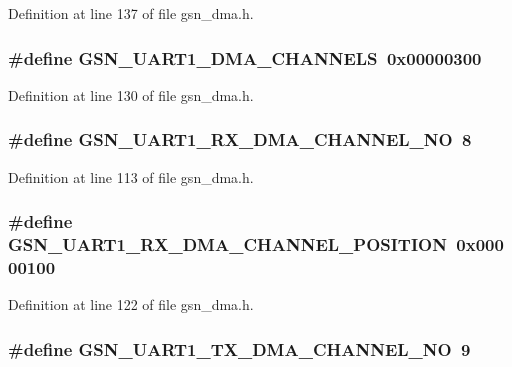 Definition at line 137 of file gsn\_\-dma.h.

\hypertarget{a00484_a49bae6c89e0e2813bc051b25e1961d6e}{
\subsubsection[{GSN\_\-UART1\_\-DMA\_\-CHANNELS}]{\setlength{\rightskip}{0pt plus 5cm}\#define GSN\_\-UART1\_\-DMA\_\-CHANNELS~0x00000300}}
\label{a00484_a49bae6c89e0e2813bc051b25e1961d6e}


Definition at line 130 of file gsn\_\-dma.h.

\hypertarget{a00484_a764876fc0a3f5d8b04993ca6b5ddbf62}{
\subsubsection[{GSN\_\-UART1\_\-RX\_\-DMA\_\-CHANNEL\_\-NO}]{\setlength{\rightskip}{0pt plus 5cm}\#define GSN\_\-UART1\_\-RX\_\-DMA\_\-CHANNEL\_\-NO~8}}
\label{a00484_a764876fc0a3f5d8b04993ca6b5ddbf62}


Definition at line 113 of file gsn\_\-dma.h.

\hypertarget{a00484_a8b6623ecbbaf5c3c6caa554e28b12def}{
\subsubsection[{GSN\_\-UART1\_\-RX\_\-DMA\_\-CHANNEL\_\-POSITION}]{\setlength{\rightskip}{0pt plus 5cm}\#define GSN\_\-UART1\_\-RX\_\-DMA\_\-CHANNEL\_\-POSITION~0x00000100}}
\label{a00484_a8b6623ecbbaf5c3c6caa554e28b12def}


Definition at line 122 of file gsn\_\-dma.h.

\hypertarget{a00484_a74b550c1871cad275c9f099bf48e3a34}{
\subsubsection[{GSN\_\-UART1\_\-TX\_\-DMA\_\-CHANNEL\_\-NO}]{\setlength{\rightskip}{0pt plus 5cm}\#define GSN\_\-UART1\_\-TX\_\-DMA\_\-CHANNEL\_\-NO~9}}
\label{a00484_a74b550c1871cad275c9f099bf48e3a34}


